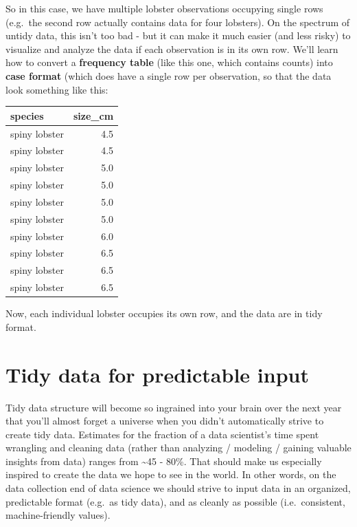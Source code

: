 \documentclass[
]{book}
\begin{document}
So in this case, we have multiple lobster observations occupying single rows (e.g.~the second row actually contains data for four lobsters). On the spectrum of untidy data, this isn't too bad - but it can make it much easier (and less risky) to visualize and analyze the data if each observation is in its own row. We'll learn how to convert a \textbf{frequency table} (like this one, which contains counts) into \textbf{case format} (which does have a single row per observation, so that the data look something like this:

\begin{table}[H]
\centering
\begin{tabular}{l|r}
\hline
species & size\_cm\\
\hline
spiny lobster & 4.5\\
\hline
spiny lobster & 4.5\\
\hline
spiny lobster & 5.0\\
\hline
spiny lobster & 5.0\\
\hline
spiny lobster & 5.0\\
\hline
spiny lobster & 5.0\\
\hline
spiny lobster & 6.0\\
\hline
spiny lobster & 6.5\\
\hline
spiny lobster & 6.5\\
\hline
spiny lobster & 6.5\\
\hline
\end{tabular}
\end{table}

Now, each individual lobster occupies its own row, and the data are in tidy format.

\hypertarget{tidy-data-for-predictable-input}{%
\section{Tidy data for predictable input}\label{tidy-data-for-predictable-input}}

Tidy data structure will become so ingrained into your brain over the next year that you'll almost forget a universe when you didn't automatically strive to create tidy data. Estimates for the fraction of a data scientist's time spent wrangling and cleaning data (rather than analyzing / modeling / gaining valuable insights from data) ranges from \textasciitilde45 - 80\%. That should make us especially inspired to create the data we hope to see in the world. In other words, on the data collection end of data science we should strive to input data in an organized, predictable format (e.g.~as tidy data), and as cleanly as possible (i.e.~consistent, machine-friendly values).\\
\end{document}
